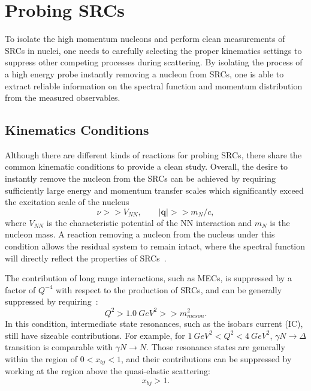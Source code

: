 \section{Probing SRCs}
To isolate the high momentum nucleons and perform clean measurements of SRCs in nuclei, one needs to carefully selecting the proper kinematics settings to suppress other competing processes during scattering. By isolating the process of a high energy probe instantly removing a nucleon from SRCs, one is able to extract reliable information on the spectral function and momentum distribution from the measured observables. 

\subsection{Kinematics Conditions}
Although there are different kinds of reactions for probing SRCs, there share the common kinematic conditions to provide a clean study. Overall, the desire to instantly remove the nucleon from the SRCs can be achieved by requiring sufficiently large energy and momentum transfer scales which significantly exceed the excitation scale of the nucleus~\cite{Frankfurt1981215,Frankfurt_misak}
\begin{equation}
  \nu >> V_{NN}, \qquad |\mathbf{q}| >> m_{N}/c,
  \label{src_condition1}
\end{equation}
where $V_{NN}$ is the characteristic potential of the NN interaction and $m_{N}$ is the nucleon mass. A reaction removing a nucleon from the nucleus under this condition allows the residual system to remain intact, where the spectral function will directly reflect the properties of SRCs~\cite{src_john}.

The contribution of long range interactions, such as MECs, is suppressed by a factor of $Q^{-4}$ with respect to the production of SRCs, and can be generally suppressed by requiring~\cite{M_Sargsian_JPG_29_2003}:
\begin{equation}
  Q^{2} > 1.0~GeV^{2} >> m_{meson}^{2}.
  \label{src_condition2}
\end{equation}
In this condition, intermediate state resonances, such as the isobars current (IC), still have sizeable contributions. For example, for $1~GeV^{2}<Q^{2}<4~GeV^{2}$, $\gamma N\rightarrow \Delta$ transition is comparable with $\gamma N\rightarrow N$. Those resonance states are generally within the region of $0<x_{bj}<1$, and their contributions can be suppressed by working at the region above the quasi-elastic scattering:
\begin{equation}
  x_{bj} > 1.
  \label{src_condition3}
\end{equation}

